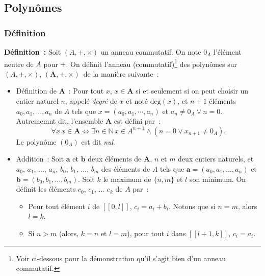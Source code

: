 \subsection{Polynômes}

\subsubsection{Définition} 

\noindent\textbf{Définition :} Soit $(A, +, \times)$ un anneau commutatif. 
    On note $0_A$ l'élément neutre de $A$ pour $+$.
    On définit l'anneau (commutatif)\footnote{Voir ci-dessous pour la démonstration qu'il s'agit bien d'un anneau commutatif.} des polynômes sur $(A, +, \times)$, $(\mathbf{A}, +, \times)$ de la manière suivante : 
    \begin{itemize}[nosep]
        \item Définition de $\mathbf{A}$ : Pour tout $x$, $x \in \mathbf{A}$ si et seulement si on peut choisir un entier naturel $n$, appelé \textit{degré} de $x$ et noté $\mathrm{deg}(x)$, et $n+1$ éléments $a_0, a_1, \dots, a_n$ de $A$ tels que $x = (a_0, a_1, \cdots, a_n)$ et $a_n \neq 0_A \vee n = 0$.
            Autrememnt dit, l'ensemble $\mathbf{A}$ est défini par : 
            \begin{equation}
                \forall x \, x \in \mathbf{A} \Leftrightarrow 
                \exists n \in \mathbb{N} \, 
                x \in A^{n+1}
                \wedge \left(
                    n = 0 
                    \vee
                    x_{n+1} \neq 0_A
                \right) .
            \end{equation}
            Le polynôme $(0_A)$ est dit \textit{nul}.
        \item Addition : Soit $\mathbf{a}$ et $\mathbf{b}$ deux éléments de $\mathbf{A}$, $n$ et $m$ deux entiers naturels, et $a_0$, $a_1$, ..., $a_n$, $b_0$, $b_1$, ..., $b_m$ des éléments de $A$ tels que $\mathbf{a} = (a_0, a_1, \dots, a_n)$ et $\mathbf{b} = (b_0, b_1, \dots, b_m)$.
            Soit $k$ le maximum de $\lbrace n, m \rbrace$ et $l$ son minimum.
            On définit les éléments $c_0$, $c_1$, ... $c_k$ de $A$ par : 
            \begin{itemize}[nosep]
                \item Pour tout élément $i$ de $[\![0, l]\!]$, $c_i = a_i + b_i$.
                    Notons que si $n = m$, alors $l = k$.
                \item Si $n > m$ (alors, $k = n$ et $l = m$), pour tout $i$ dans $[\![l+1, k]\!]$, $c_i = a_i$.

\end{itemize}
\end{itemize}
